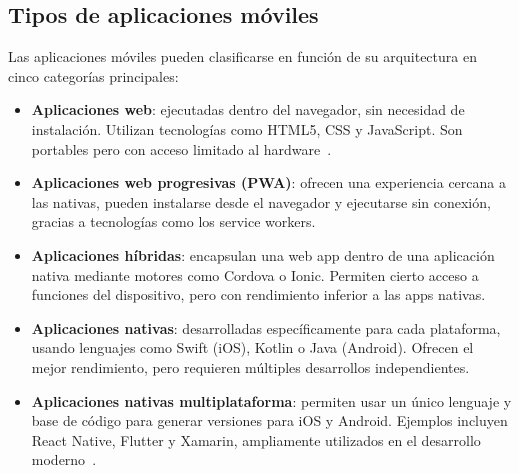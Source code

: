 \subsection{Tipos de aplicaciones móviles}

Las aplicaciones móviles pueden clasificarse en función de su arquitectura en cinco categorías principales:

\begin{itemize}
    \item \textbf{Aplicaciones web}: ejecutadas dentro del navegador, sin necesidad de instalación. Utilizan tecnologías como HTML5, CSS y JavaScript. Son portables pero con acceso limitado al hardware~\cite{nguyen2018}.
    \item \textbf{Aplicaciones web progresivas (PWA)}: ofrecen una experiencia cercana a las nativas, pueden instalarse desde el navegador y ejecutarse sin conexión, gracias a tecnologías como los service workers.
    \item \textbf{Aplicaciones híbridas}: encapsulan una web app dentro de una aplicación nativa mediante motores como Cordova o Ionic. Permiten cierto acceso a funciones del dispositivo, pero con rendimiento inferior a las apps nativas.
    \item \textbf{Aplicaciones nativas}: desarrolladas específicamente para cada plataforma, usando lenguajes como Swift (iOS), Kotlin o Java (Android). Ofrecen el mejor rendimiento, pero requieren múltiples desarrollos independientes.
    \item \textbf{Aplicaciones nativas multiplataforma}: permiten usar un único lenguaje y base de código para generar versiones para iOS y Android. Ejemplos incluyen React Native, Flutter y Xamarin, ampliamente utilizados en el desarrollo moderno~\cite{gartner2022}.
\end{itemize}


